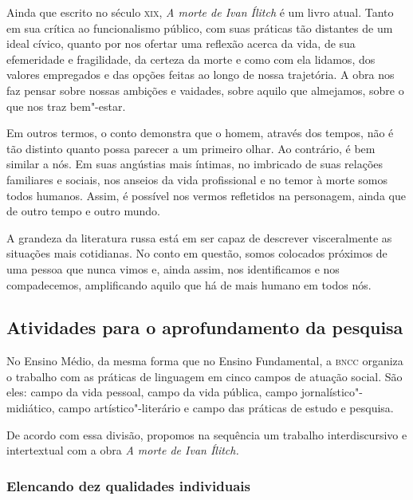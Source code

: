 \documentclass[12pt]{extarticle}
\begin{document}
Ainda que escrito no século \textsc{xix}, \emph{A morte de Ivan Ílitch} é um livro
atual. Tanto em sua crítica ao funcionalismo público, com suas práticas
tão distantes de um ideal cívico, quanto por nos
ofertar uma reflexão acerca da vida, de sua efemeridade e fragilidade,
da certeza da morte e como com ela lidamos, dos valores empregados e das
opções feitas ao longo de nossa trajetória. A obra nos faz pensar sobre nossas
ambições e vaidades, sobre aquilo que almejamos, sobre o que nos traz
bem"-estar.

Em outros termos, o conto demonstra que o homem, através dos tempos, não
é tão distinto quanto possa parecer a um primeiro olhar. Ao contrário, é
bem similar a nós. Em suas angústias mais íntimas, no imbricado de suas
relações familiares e sociais, nos anseios da vida profissional e no
temor à morte somos todos humanos. Assim, é possível nos vermos
refletidos na personagem, ainda que de outro tempo e outro mundo.

A grandeza da literatura russa está em ser capaz de descrever
visceralmente as situações mais cotidianas. No conto em questão, somos
colocados próximos de uma pessoa que nunca vimos e, ainda 
assim, nos identificamos e nos
compadecemos, amplificando aquilo que há de mais humano em todos nós.




\subsection{Atividades para o aprofundamento da pesquisa}

No Ensino Médio, da mesma forma que no Ensino Fundamental, a \textsc{bncc}
organiza o trabalho com as práticas de linguagem em cinco campos
de atuação social. São eles: campo da vida pessoal, campo da vida
pública, campo jornalístico"-midiático, campo artístico"-literário e campo
das práticas de estudo e pesquisa.

De acordo com essa divisão, propomos na sequência um trabalho
interdiscursivo e intertextual com a obra \emph{A morte de Ivan Ílitch.}

\subsubsection{Elencando dez qualidades individuais}
\end{document}
